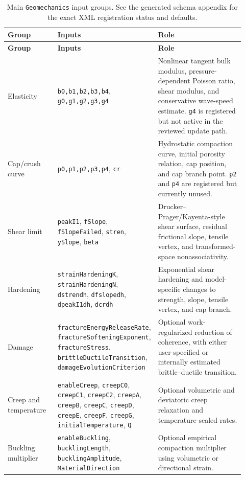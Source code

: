 \begin{longtable}{@{}p{0.22\linewidth}p{0.28\linewidth}p{0.42\linewidth}@{}}
\caption{Main \texttt{Geomechanics} input groups.  See the generated schema appendix for the exact XML registration status and defaults.\label{tab:geomechanics-parameters}}\\
\toprule
\textbf{Group} & \textbf{Inputs} & \textbf{Role}\\
\midrule
\endfirsthead
\toprule
\textbf{Group} & \textbf{Inputs} & \textbf{Role}\\
\midrule
\endhead
Elasticity & \texttt{b0,b1,b2,b3,b4}, \texttt{g0,g1,g2,g3,g4} & Nonlinear tangent bulk modulus, pressure-dependent Poisson ratio, shear modulus, and conservative wave-speed estimate.  \texttt{g4} is registered but not active in the reviewed update path.\\
Cap/crush curve & \texttt{p0,p1,p2,p3,p4}, \texttt{cr} & Hydrostatic compaction curve, initial porosity relation, cap position, and cap branch point.  \texttt{p2} and \texttt{p4} are registered but currently unused.\\
Shear limit & \texttt{peakI1}, \texttt{fSlope}, \texttt{fSlopeFailed}, \texttt{stren}, \texttt{ySlope}, \texttt{beta} & Drucker--Prager/Kayenta-style shear surface, residual frictional slope, tensile vertex, and transformed-space nonassociativity.\\
Hardening & \texttt{strainHardeningK}, \texttt{strainHardeningN}, \texttt{dstrendh}, \texttt{dfslopedh}, \texttt{dpeakI1dh}, \texttt{dcrdh} & Exponential shear hardening and model-specific changes to strength, slope, tensile vertex, and cap branch.\\
Damage & \texttt{fractureEnergyReleaseRate}, \texttt{fractureSofteningExponent}, \texttt{fractureStress}, \texttt{brittleDuctileTransition}, \texttt{damageEvolutionCriterion} & Optional work-regularized reduction of coherence, with either user-specified or internally estimated brittle--ductile transition.\\
Creep and temperature & \texttt{enableCreep}, \texttt{creepC0}, \texttt{creepC1}, \texttt{creepC2}, \texttt{creepA}, \texttt{creepB}, \texttt{creepC}, \texttt{creepD}, \texttt{creepE}, \texttt{creepF}, \texttt{creepG}, \texttt{initialTemperature}, \texttt{Q} & Optional volumetric and deviatoric creep relaxation and temperature-scaled rates.\\
Buckling multiplier & \texttt{enableBuckling}, \texttt{bucklingLength}, \texttt{bucklingAmplitude}, \texttt{MaterialDirection} & Optional empirical compaction multiplier using volumetric or directional strain.\\

\end{longtable}

